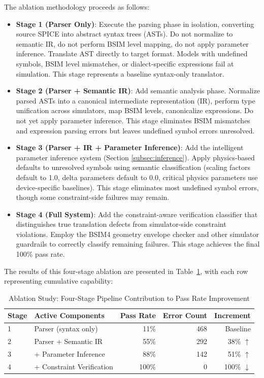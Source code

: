 \documentclass[conference]{IEEEtran}
\begin{document}
The ablation methodology proceeds as follows:

\begin{itemize}
\item \textbf{Stage 1 (Parser Only)}: Execute the parsing phase in isolation, converting source SPICE into abstract syntax trees (ASTs). Do not normalize to semantic IR, do not perform BSIM level mapping, do not apply parameter inference. Translate AST directly to target format. Models with undefined symbols, BSIM level mismatches, or dialect-specific expressions fail at simulation. This stage represents a baseline syntax-only translator.

\item \textbf{Stage 2 (Parser + Semantic IR)}: Add semantic analysis phase. Normalize parsed ASTs into a canonical intermediate representation (IR), perform type unification across simulators, map BSIM levels, canonicalize expressions. Do not yet apply parameter inference. This stage eliminates BSIM mismatches and expression parsing errors but leaves undefined symbol errors unresolved.

\item \textbf{Stage 3 (Parser + IR + Parameter Inference)}: Add the intelligent parameter inference system (Section \ref{subsec:inference}). Apply physics-based defaults to unresolved symbols using semantic classification (scaling factors default to 1.0, delta parameters default to 0.0, critical physics parameters use device-specific baselines). This stage eliminates most undefined symbol errors, though some constraint-side failures may remain.

\item \textbf{Stage 4 (Full System)}: Add the constraint-aware verification classifier that distinguishes true translation defects from simulator-side constraint violations. Employ the BSIM4 geometry envelope checker and other simulator guardrails to correctly classify remaining failures. This stage achieves the final 100\% pass rate.
\end{itemize}

The results of this four-stage ablation are presented in Table~\ref{tab:ablation}, with each row representing cumulative capability:

\begin{table}[!t]
\caption{Ablation Study: Four-Stage Pipeline Contribution to Pass Rate Improvement}
\label{tab:ablation}
\centering
\renewcommand{\arraystretch}{1.15}
\begin{tabular}{@{}llrrr@{}}
\toprule
\textbf{Stage} & \textbf{Active Components} & \textbf{Pass Rate} & \textbf{Error Count} & \textbf{Increment} \\
\midrule
1 & Parser (syntax only) & 11\% & 468 & Baseline \\
2 & Parser + Semantic IR & 55\% & 292 & 38\% $\uparrow$ \\
3 & + Parameter Inference & 88\% & 142 & 51\% $\uparrow$ \\
4 & + Constraint Verification & 100\% & 0 & 100\% $\downarrow$ \\
\bottomrule
\end{tabular}
\end{table}
\end{document}
